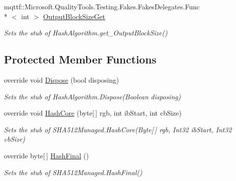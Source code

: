\begin{DoxyCompactItemize}
mqttf\-::\-Microsoft.\-Quality\-Tools.\-Testing.\-Fakes.\-Fakes\-Delegates.\-Func\\*
$<$ int $>$ \hyperlink{class_system_1_1_security_1_1_cryptography_1_1_fakes_1_1_stub_s_h_a512_managed_ac0b3214ba8c00960c29f08e348f85ffd}{Output\-Block\-Size\-Get}
\begin{DoxyCompactList}\small\item\em Sets the stub of Hash\-Algorithm.\-get\-\_\-\-Output\-Block\-Size()\end{DoxyCompactList}\end{DoxyCompactItemize}
\subsection*{Protected Member Functions}
\begin{DoxyCompactItemize}
\item 
override void \hyperlink{class_system_1_1_security_1_1_cryptography_1_1_fakes_1_1_stub_s_h_a512_managed_a458992de9b5b34b129d90907d481453c}{Dispose} (bool disposing)
\begin{DoxyCompactList}\small\item\em Sets the stub of Hash\-Algorithm.\-Dispose(\-Boolean disposing)\end{DoxyCompactList}\item 
override void \hyperlink{class_system_1_1_security_1_1_cryptography_1_1_fakes_1_1_stub_s_h_a512_managed_a8de054455ae2e093d7f6f54843f174bc}{Hash\-Core} (byte\mbox{[}$\,$\mbox{]} rgb, int ib\-Start, int cb\-Size)
\begin{DoxyCompactList}\small\item\em Sets the stub of S\-H\-A512\-Managed.\-Hash\-Core(\-Byte\mbox{[}$\,$\mbox{]} rgb, Int32 ib\-Start, Int32 cb\-Size)\end{DoxyCompactList}\item 
override byte\mbox{[}$\,$\mbox{]} \hyperlink{class_system_1_1_security_1_1_cryptography_1_1_fakes_1_1_stub_s_h_a512_managed_a523360efe16c1b5db1db9791f061520c}{Hash\-Final} ()
\begin{DoxyCompactList}\small\item\em Sets the stub of S\-H\-A512\-Managed.\-Hash\-Final()\end{DoxyCompactList}\end{DoxyCompactItemize}
